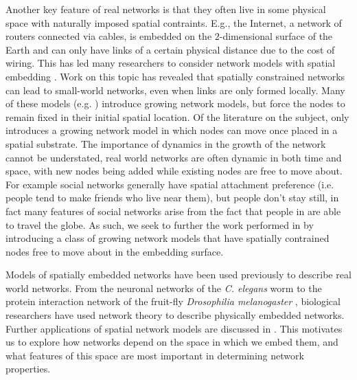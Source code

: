 \documentclass[aps,pre,reprint,superscriptaddress,amsmath,amssymb,nofootinbib]{revtex4-1}
\begin{document}
Another key feature of real networks is that they often live in some physical space with naturally imposed spatial contraints. 
E.g., the Internet, a network of routers connected via cables, is embedded on the $2$-dimensional surface of the Earth and can only have links of a certain physical distance due to the cost of wiring.
This has led many researchers to consider network models with spatial embedding \cite{ozik2004,przuljgeo,hermannspace,bullockspatial,guan1D,zhang2006,zhang2007}.
Work on this topic has revealed that spatially constrained networks can lead to small-world networks, even when links are only formed locally.
Many of these models (e.g. \cite{bullockspatial,guan1D,przuljgeo}) introduce growing network models, but force the nodes to remain fixed in their initial spatial location.
Of the literature on the subject, only \cite{ozik2004} introduces a growing network model in which nodes can move once placed in a spatial substrate.
The importance of dynamics in the growth of the network cannot be understated, real world networks are often dynamic in both time and space, with new nodes being added while existing nodes are free to move about.
For example social networks generally have spatial attachment preference (i.e. people tend to make friends who live near them), but people don't stay still, in fact many features of social networks arise from the fact that people in are able to travel the globe. 
As such, we seek to further the work performed in \cite{ozik2004} by introducing a class of growing network models that have spatially contrained nodes free to move about in the embedding surface. 

Models of spatially embedded networks have been used previously to describe real world networks.
From the neuronal networks of the \textit{C. elegans} worm \cite{plenzcascade} to the protein interaction network of the fruit-fly \textit{Drosophilia melanogaster} \cite{fruitfly}, biological researchers have used network theory to describe physically embedded networks.
Further applications of spatial network models are discussed in \cite{neuronembedding,barthelemy,vazquez2002}.
This motivates us to explore how networks depend on the space in which we embed them, and what features of this space are most important in determining network properties.
\end{document}
